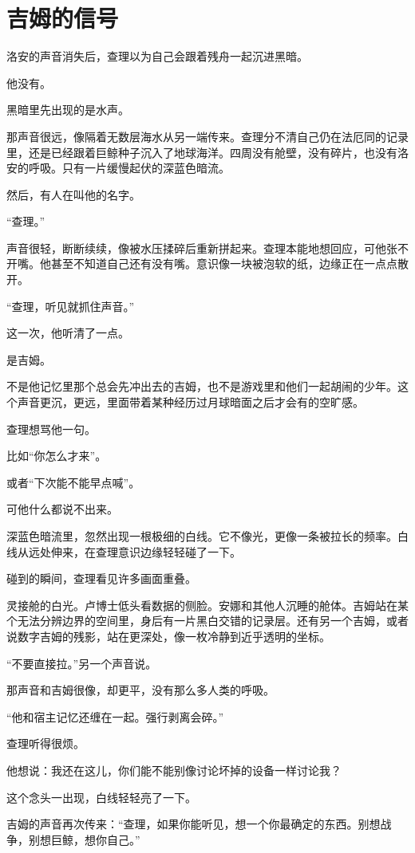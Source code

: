 \chapter{吉姆的信号}

洛安的声音消失后，查理以为自己会跟着残舟一起沉进黑暗。

他没有。

黑暗里先出现的是水声。

那声音很远，像隔着无数层海水从另一端传来。查理分不清自己仍在法厄同的记录里，还是已经跟着巨鲸种子沉入了地球海洋。四周没有舱壁，没有碎片，也没有洛安的呼吸。只有一片缓慢起伏的深蓝色暗流。

然后，有人在叫他的名字。

“查理。”

声音很轻，断断续续，像被水压揉碎后重新拼起来。查理本能地想回应，可他张不开嘴。他甚至不知道自己还有没有嘴。意识像一块被泡软的纸，边缘正在一点点散开。

“查理，听见就抓住声音。”

这一次，他听清了一点。

是吉姆。

不是他记忆里那个总会先冲出去的吉姆，也不是游戏里和他们一起胡闹的少年。这个声音更沉，更远，里面带着某种经历过月球暗面之后才会有的空旷感。

查理想骂他一句。

比如“你怎么才来”。

或者“下次能不能早点喊”。

可他什么都说不出来。

深蓝色暗流里，忽然出现一根极细的白线。它不像光，更像一条被拉长的频率。白线从远处伸来，在查理意识边缘轻轻碰了一下。

碰到的瞬间，查理看见许多画面重叠。

灵接舱的白光。卢博士低头看数据的侧脸。安娜和其他人沉睡的舱体。吉姆站在某个无法分辨边界的空间里，身后有一片黑白交错的记录层。还有另一个吉姆，或者说数字吉姆的残影，站在更深处，像一枚冷静到近乎透明的坐标。

“不要直接拉。”另一个声音说。

那声音和吉姆很像，却更平，没有那么多人类的呼吸。

“他和宿主记忆还缠在一起。强行剥离会碎。”

查理听得很烦。

他想说：我还在这儿，你们能不能别像讨论坏掉的设备一样讨论我？

这个念头一出现，白线轻轻亮了一下。

吉姆的声音再次传来：“查理，如果你能听见，想一个你最确定的东西。别想战争，别想巨鲸，想你自己。”

